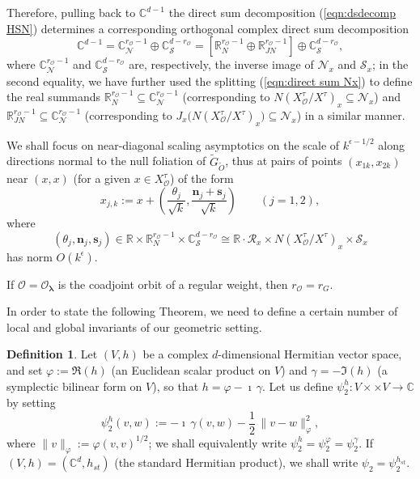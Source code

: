 \documentclass[12pt,a4paper]{article}
\theoremstyle{plain}
\theoremstyle{definition}
\newtheorem{defn}[thm]{Definition}%
\begin{document}
Therefore, pulling back to $\mathbb{C}^{d-1}$ the direct sum decomposition 
(\ref{eqn:dsdecomp HSN})
determines a corresponding orthogonal complex direct sum decomposition
$$
\mathbb{C}^{d-1}= \mathbb{C}^{r_{\mathcal{O}}-1}_{\mathcal{N}}\oplus
\mathbb{C}^{d-r_{\mathcal{O}}}_{\mathcal{S}}
=\left[\mathbb{R}^{r_{\mathcal{O}}-1}_{N}\oplus 
\mathbb{R}^{r_{\mathcal{O}}-1}_{JN}\right]
\oplus \mathbb{C}^{d-r_{\mathcal{O}}}_{\mathcal{S}},
$$
where $\mathbb{C}^{r_{\mathcal{O}}-1}_{\mathcal{N}}$
and $\mathbb{C}^{d-r_{\mathcal{O}}}_{\mathcal{S}}$ are, respectively, 
the inverse image
of $\mathcal{N}_x$ and $\mathcal{S}_x$; in the second equality, 
we have further used the splitting (\ref{eqn:direct sum Nx}) to define the
real summands $\mathbb{R}^{r_{\mathcal{O}}-1}_{N}
\subseteq \mathbb{C}^{r_{\mathcal{O}}-1}_{\mathcal{N}}
$ (corresponding to
$N(X^\tau_{\mathcal{O}}/X^\tau)_x\subseteq \mathcal{N}_x$) and $\mathbb{R}^{r_{\mathcal{O}}-1}_{JN}\subseteq \mathbb{C}^{r_{\mathcal{O}}-1}_{\mathcal{N}}$
(corresponding to $J_x\big(N(X^\tau_{\mathcal{O}}/X^\tau)_x\big)
\subseteq \mathcal{N}_x$) in a similar manner.

We shall focus on near-diagonal scaling asymptotics on the scale
of $k^{\epsilon-1/2}$ along directions normal to the null foliation
of $\tilde{G}_{\tilde{O}}$, thus at pairs of points 
$(x_{1k},x_{2k})$
near $(x,x)$ (for a given $x\in X^\tau_{\mathcal{O}}$) of the form
\begin{equation}
\label{eqn:defn di xjk}
x_{j,k}:=x+\left(\frac{\theta_j}{\sqrt{k}},
\frac{\mathbf{n}_j+\mathbf{s}_j}{\sqrt{k}}  \right)
\qquad (j=1,2),
\end{equation}
%
where 
\begin{equation}
\label{eqn:defn scaling vectors}
(\theta_j,\mathbf{n}_j,\mathbf{s}_j)\in \mathbb{R}\times
\mathbb{R}^{r_{\mathcal{O}}-1}_{N}\times \mathbb{C}^{d-r_{\mathcal{O}}}_{\mathcal{S}}
\cong \mathbb{R}\cdot \mathcal{R}_x\times N(X^\tau_{\mathcal{O}}/X^\tau)_x\times 
\mathcal{S}_x
\end{equation}
has norm $O\left(k^\epsilon\right)$.

If  
$\mathcal{O}=\mathcal{O}_{\boldsymbol{\lambda}}$ is the coadjoint orbit of
a regular weight, then $r_{\mathcal{O}}=r_G$.

In order to state the following Theorem, we need to
define a certain number of local and global invariants
of our geometric setting.

\begin{defn}
Let $(V,h)$ be a complex $d$-dimensional Hermitian vector space,
and set $\varphi:=\Re(h)$ (an Euclidean scalar product on $V$)
and $\gamma=-\Im(h)$ (a symplectic bilinear form on
$V$), so that
$h=\varphi-\imath\,\gamma$. 
Let us define 
$\psi_2^h:V\times \times V\rightarrow \mathbb{C}$ by
setting
$$
\psi_2^h(v,w):=-\imath\,\gamma(v,w)-\frac{1}{2}\,
\|v-w\|_\varphi^2,
$$
where $\|v \|_\varphi:=\varphi(v,v)^{1/2}$; 
we shall equivalently write $\psi_2^h=
\psi_2^\varphi=\psi_2^\gamma$.
If $(V,h)=(\mathbb{C}^d,h_{st})$ (the standard Hermitian
product), we shall write $\psi_2=\psi_2^{h_{st}}$.

\end{defn}
\end{document}
